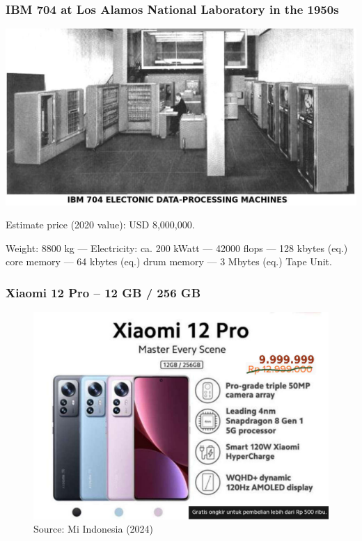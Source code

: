 \documentclass[aspectratio=169, xcolor=table, notheorems, hyperref={pdfpagelabels=false}]{beamer}
\begin{document}
\begin{frame}
\frametitle{IBM 704 at Los Alamos National Laboratory in the 1950s}
\includegraphics[width=0.75\linewidth]{os-ibm704}

Estimate price (2020 value): USD 8,000,000.

Weight: 8800 kg --- Electricity: ca. 200 kWatt --- 42000 flops --- 
128 kbytes (eq.) core memory --- 64 kbytes (eq.) drum memory --- 3 Mbytes (eq.) Tape Unit.

\end{frame}

\begin{frame}
\frametitle{Xiaomi 12 Pro -- 12 GB / 256 GB}
\begin{figure}
\includegraphics[width=0.63\linewidth]{xiaome12pro}
\caption{Source: Mi Indonesia (2024)}
\end{figure}
\end{frame}

\end{document}
